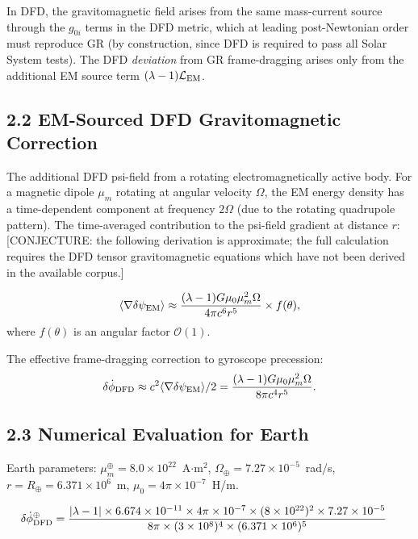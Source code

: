 \documentclass[11pt,twocolumn]{article}
\newcommand{\dpsi}{\delta\psi}
\newcommand{\lam}{\lambda}
\newcommand{\order}[1]{\mathcal{O}(#1)}
\begin{document}
In DFD, the gravitomagnetic field arises from the same mass-current source
through the $g_{0i}$ terms in the DFD metric, which at leading post-Newtonian
order must reproduce GR (by construction, since DFD is required to pass all
Solar System tests). The DFD \emph{deviation} from GR frame-dragging arises
only from the additional EM source term $(\lam-1)\mathcal{L}_{\rm EM}$.

\subsection*{2.2 EM-Sourced DFD Gravitomagnetic Correction}

The additional DFD psi-field from a rotating electromagnetically active
body. For a magnetic dipole $\mu_m$ rotating at angular velocity $\Omega$,
the EM energy density has a time-dependent component at frequency $2\Omega$
(due to the rotating quadrupole pattern). The time-averaged contribution
to the psi-field gradient at distance $r$:
\textcolor{conjecturecolor}{[CONJECTURE: the following derivation is
approximate; the full calculation requires the DFD tensor gravitomagnetic
equations which have not been derived in the available corpus.]}

\begin{equation}
\langle\nabla\dpsi_{\rm EM}\rangle
\approx \frac{(\lam-1)G\mu_0\mu_m^2\Omega}{4\pi c^6 r^5}
\times f(\theta),
\label{eq:gm_EM_correction}
\end{equation}
where $f(\theta)$ is an angular factor $\order{1}$.

The effective frame-dragging correction to gyroscope precession:
\begin{equation}
\delta\dot\phi_{\rm DFD} \approx c^2\langle\nabla\dpsi_{\rm EM}\rangle/2
= \frac{(\lam-1)G\mu_0\mu_m^2\Omega}{8\pi c^4 r^5}.
\label{eq:gm_precession}
\end{equation}

\subsection*{2.3 Numerical Evaluation for Earth}

Earth parameters: $\mu_m^\oplus = 8.0\times10^{22}$~A$\cdot$m$^2$,
$\Omega_\oplus = 7.27\times10^{-5}$~rad/s, $r = R_\oplus = 6.371\times10^6$~m,
$\mu_0 = 4\pi\times10^{-7}$~H/m.

\begin{align}
\delta\dot\phi_{\rm DFD}^\oplus
&= \frac{|\lam-1|\times 6.674\times10^{-11}
  \times 4\pi\times10^{-7}
  \times (8\times10^{22})^2
  \times 7.27\times10^{-5}}
  {8\pi\times (3\times10^8)^4\times (6.371\times10^6)^5}
\label{eq:earth_gm_calc}
\end{align}
\end{document}
